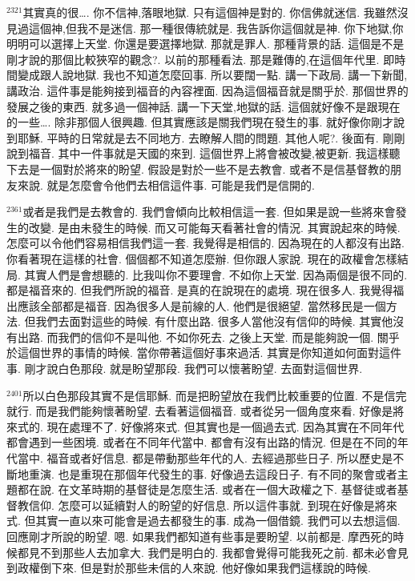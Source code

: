 \documentclass{book}
\begin{document}
$^{2321}$其實真的很….
你不信神,落眼地獄.
只有這個神是對的.
你信佛就迷信.
我雖然沒見過這個神,但我不是迷信.
那一種很傳統就是.
我告訴你這個就是神.
你下地獄,你明明可以選擇上天堂.
你還是要選擇地獄.
那就是罪人.
那種背景的話.
這個是不是剛才說的那個比較狹窄的觀念?.
以前的那種看法.
那是難傳的,在這個年代里.
即時間變成跟人說地獄.
我也不知道怎麼回事.
所以要闊一點.
講一下政局.
講一下新聞,講政治.
這件事是能夠接到福音的內容裡面.
因為這個福音就是關乎於.
那個世界的發展之後的東西.
就多過一個神話.
講一下天堂,地獄的話.
這個就好像不是跟現在的一些….
除非那個人很興趣.
但其實應該是關我們現在發生的事.
就好像你剛才說到耶穌.
平時的日常就是去不同地方.
去瞭解人間的問題.
其他人呢?.
後面有.
剛剛說到福音.
其中一件事就是天國的來到.
這個世界上將會被改變,被更新.
我這樣聽下去是一個對於將來的盼望.
假設是對於一些不是去教會.
或者不是信基督教的朋友來說.
就是怎麼會令他們去相信這件事.
可能是我們是信開的.

$^{2361}$或者是我們是去教會的.
我們會傾向比較相信這一套.
但如果是說一些將來會發生的改變.
是由未發生的時候.
而又可能每天看著社會的情況.
其實說起來的時候.
怎麼可以令他們容易相信我們這一套.
我覺得是相信的.
因為現在的人都沒有出路.
你看著現在這樣的社會.
個個都不知道怎麼辦.
但你跟人家說.
現在的政權會怎樣結局.
其實人們是會想聽的.
比我叫你不要理會.
不如你上天堂.
因為兩個是很不同的.
都是福音來的.
但我們所說的福音.
是真的在說現在的處境.
現在很多人.
我覺得福出應該全部都是福音.
因為很多人是前線的人.
他們是很絕望.
當然移民是一個方法.
但我們去面對這些的時候.
有什麼出路.
很多人當他沒有信仰的時候.
其實他沒有出路.
而我們的信仰不是叫他.
不如你死去.
之後上天堂.
而是能夠說一個.
關乎於這個世界的事情的時候.
當你帶著這個好事來過活.
其實是你知道如何面對這件事.
剛才說白色那段.
就是盼望那段.
我們可以懷著盼望.
去面對這個世界.

$^{2401}$所以白色那段其實不是信耶穌.
而是把盼望放在我們比較重要的位置.
不是信完就行.
而是我們能夠懷著盼望.
去看著這個福音.
或者從另一個角度來看.
好像是將來式的.
現在處理不了.
好像將來式.
但其實也是一個過去式.
因為其實在不同年代都會遇到一些困境.
或者在不同年代當中.
都會有沒有出路的情況.
但是在不同的年代當中.
福音或者好信息.
都是帶動那些年代的人.
去經過那些日子.
所以歷史是不斷地重演.
也是重現在那個年代發生的事.
好像過去這段日子.
有不同的聚會或者主題都在說.
在文革時期的基督徒是怎麼生活.
或者在一個大政權之下.
基督徒或者基督教信仰.
怎麼可以延續對人的盼望的好信息.
所以這件事就.
到現在好像是將來式.
但其實一直以來可能會是過去都發生的事.
成為一個借鏡.
我們可以去想這個.
回應剛才所說的盼望.
嗯.
如果我們都知道有些事是要盼望.
以前都是.
摩西死的時候都見不到那些人去加拿大.
我們是明白的.
我都會覺得可能我死之前.
都未必會見到政權倒下來.
但是對於那些未信的人來說.
他好像如果我們這樣說的時候.
\end{document}
